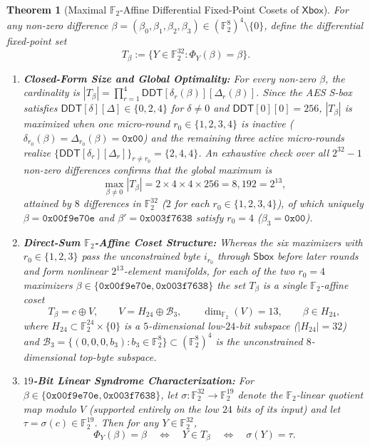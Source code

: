 \documentclass[11pt,a4paper]{article}
\newtheorem{theorem}{Theorem}
\theoremstyle{definition}
\theoremstyle{remark}
\newcommand{\Ftwo}{\mathbb{F}_2}
\newcommand{\Xbox}{\mathsf{Xbox}}
\newcommand{\Sbox}{\mathsf{Sbox}}
\begin{document}
\begin{theorem}[Maximal $\Ftwo$-Affine Differential Fixed-Point Cosets of $\Xbox$]
\label{thm:xbox-coset}
For any non-zero difference $\beta = (\beta_0, \beta_1, \beta_2, \beta_3) \in (\Ftwo^8)^4 \setminus \{0\}$, define the differential fixed-point set
\[
T_\beta := \big\{ Y \in \Ftwo^{32} : \Phi_Y(\beta) = \beta \big\}.
\]
\begin{enumerate}[leftmargin=2em]
    \item \textbf{Closed-Form Size and Global Optimality:} For every non-zero $\beta$, the cardinality is $|T_\beta| = \prod_{r=1}^4 \mathsf{DDT}[\delta_r(\beta)][\Delta_r(\beta)]$. Since the AES S-box satisfies $\mathsf{DDT}[\delta][\Delta] \in \{0, 2, 4\}$ for $\delta \neq 0$ and $\mathsf{DDT}[0][0] = 256$, $|T_\beta|$ is maximized when one micro-round $r_0 \in \{1, 2, 3, 4\}$ is inactive ($\delta_{r_0}(\beta) = \Delta_{r_0}(\beta) = \mathtt{0x00}$) and the remaining three active micro-rounds realize $\{\mathsf{DDT}[\delta_r][\Delta_r]\}_{r \neq r_0} = \{2, 4, 4\}$. An exhaustive check over all $2^{32}-1$ non-zero differences confirms that the global maximum is
    \[
    \max_{\beta \neq 0} |T_\beta| = 2 \times 4 \times 4 \times 256 = 8{,}192 = 2^{13},
    \]
    attained by $8$ differences in $\Ftwo^{32}$ ($2$ for each $r_0 \in \{1, 2, 3, 4\}$), of which uniquely $\beta = \mathtt{0x00f9e70e}$ and $\beta' = \mathtt{0x003f7638}$ satisfy $r_0 = 4$ ($\beta_3 = \mathtt{0x00}$).
    \item \textbf{Direct-Sum $\Ftwo$-Affine Coset Structure:} Whereas the six maximizers with $r_0 \in \{1, 2, 3\}$ pass the unconstrained byte $i_{r_0}$ through $\Sbox$ before later rounds and form nonlinear $2^{13}$-element manifolds, for each of the two $r_0 = 4$ maximizers $\beta \in \{\mathtt{0x00f9e70e}, \mathtt{0x003f7638}\}$ the set $T_\beta$ is a \emph{single} $\Ftwo$-affine coset
    \[
    T_\beta = c \oplus V, \qquad V = H_{24} \oplus \mathcal{B}_3, \qquad \dim_{\Ftwo}(V) = 13, \qquad \beta \in H_{24},
    \]
    where $H_{24} \subset \Ftwo^{24} \times \{0\}$ is a $5$-dimensional low-$24$-bit subspace ($|H_{24}| = 32$) and $\mathcal{B}_3 = \{(0, 0, 0, b_3) : b_3 \in \Ftwo^8\} \subset (\Ftwo^8)^4$ is the unconstrained $8$-dimensional top-byte subspace.
    \item \textbf{$19$-Bit Linear Syndrome Characterization:} For $\beta \in \{\mathtt{0x00f9e70e}, \mathtt{0x003f7638}\}$, let $\sigma : \Ftwo^{32} \to \Ftwo^{19}$ denote the $\Ftwo$-linear quotient map modulo $V$ (supported entirely on the low $24$ bits of its input) and let $\tau = \sigma(c) \in \Ftwo^{19}$. Then for any $Y \in \Ftwo^{32}$,
    \begin{equation}
    \label{eq:syndrome-test}
    \Phi_Y(\beta) = \beta \quad \Longleftrightarrow \quad Y \in T_\beta \quad \Longleftrightarrow \quad \sigma(Y) = \tau.
    \end{equation}
\end{enumerate}
\end{theorem}
\end{document}
